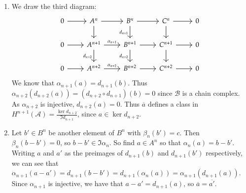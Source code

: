 \documentclass[12pt]{article}
\theoremstyle{definitionstyle}
\begin{document}
\begin{enumerate}[label=(\alph*)]
        \item We draw the third diagram:
        \[\begin{tikzcd}
            0 & {A^n} & {B^n} & {C^n} & 0 \\
            0 & {A^{n+1}} & {B^{n+1}} & {C^{n+1}} & 0 \\
            0 & {A^{n+2}} & {B^{n+2}} & {C^{n+2}} & 0
            \arrow[from=1-1, to=1-2]
            \arrow[from=1-2, to=1-3]
            \arrow[from=1-2, to=2-2]
            \arrow[from=1-3, to=1-4]
            \arrow["{d_{n+1}}"', from=1-3, to=2-3]
            \arrow[from=1-4, to=1-5]
            \arrow[from=1-4, to=2-4]
            \arrow[from=2-1, to=2-2]
            \arrow["{\alpha_{n+1}}", from=2-2, to=2-3]
            \arrow["{d_{n+2}}"', from=2-2, to=3-2]
            \arrow[from=2-3, to=2-4]
            \arrow["{d_{n+2}}"', from=2-3, to=3-3]
            \arrow[from=2-4, to=2-5]
            \arrow[from=2-4, to=3-4]
            \arrow[from=3-1, to=3-2]
            \arrow["{\alpha_{n+2}}", from=3-2, to=3-3]
            \arrow[from=3-3, to=3-4]
            \arrow[from=3-4, to=3-5]
        \end{tikzcd}\]
        We know that $\alpha_{n+1}(a) = d_{n+1}(b)$. Thus $\alpha_{n+2}(d_{n+2}(a)) = (d_{n+2} \circ d_{n+1})(b) = 0$ since $\mathscr{B}$ is a chain complex. As $\alpha_{n+2}$ is injective, $d_{n+2}(a) = 0$. Thus $\overline a$ defines a class in $H^{n+1}(\mathscr A) = \frac{\ker d_{n+2}}{\Im d_{n+1}}$, since $a \in \ker d_{n+2}$.
        \item Let $b' \in B^n$ be another element of $B^n$ with $\beta_n(b') = c$. Then $\beta_n(b - b') = 0$, so $b - b' \in \Im \alpha_n$. So find $a \in A^n$ so that $\alpha_n(a) = b - b'$. Writing $a$ and $a'$ as the preimages of $d_{n+1}(b)$ and $d_{n+1}(b')$ respectively, we can see that $\alpha_{n+1}(a - a') = d_{n+1}(b - b') = d_{n+1}(\alpha_n(a)) = \alpha_{n+1}(d_{n+1}(a))$. Since $\alpha_{n+1}$ is injective, we have that $a - a' = d_{n+1}(a)$, so $\overline{a} = \overline{a'}$.
        

\end{enumerate}
\end{document}
